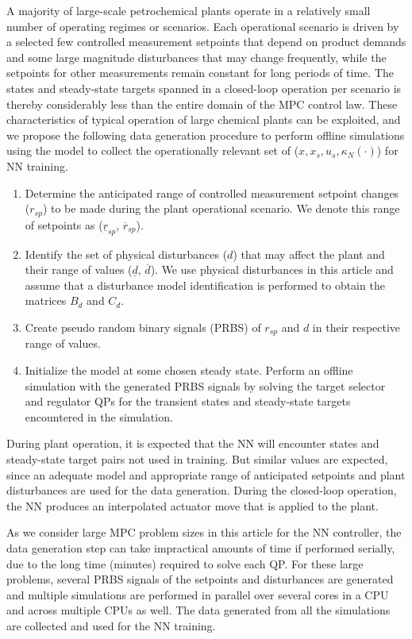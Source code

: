 \documentclass[preprint,5p, twocolumn, authoryear]{elsarticle}
\begin{document}
A majority of large-scale petrochemical plants operate in a relatively small
number of operating regimes or scenarios. Each operational scenario is driven by
a selected few controlled measurement setpoints that depend on product demands
and some large magnitude disturbances that may change frequently, while the
setpoints for other measurements remain constant for long periods of time. The
states and steady-state targets spanned in a closed-loop operation per scenario
is thereby considerably less than the entire domain of the MPC control law.
These characteristics of typical operation of large chemical plants can be
exploited, and we propose the following data generation procedure to perform
offline simulations using the model to collect the operationally relevant set of
($x, x_s, u_s, \kappa_N(\cdot)$) for NN training.

\begin{enumerate}
    \item Determine the anticipated range of controlled measurement setpoint
    changes ($r_{sp}$) to be made during the plant operational scenario. We
    denote this range of setpoints as ($\underline{r}_{sp}$,
    $\overline{r}_{sp}$).
    \item Identify the set of physical disturbances ($d$) that may affect the
    plant and their range of values ($\underline{d}$, $\overline{d}$). We use
    physical disturbances in this article and assume that a disturbance model
    identification is performed to obtain the matrices $B_d$ and $C_d$.
    \item Create pseudo random binary signals (PRBS) of $r_{sp}$ and $d$ in
    their respective range of values.
    \item Initialize the model at some chosen steady state. Perform an offline
    simulation with the generated PRBS signals by solving the target selector
    and regulator QPs for the transient states and steady-state targets
    encountered in the simulation. 
\end{enumerate}

During plant operation, it is expected that the NN will encounter states and
steady-state target pairs not used in training. But similar values are expected,
since an adequate model and appropriate range of anticipated setpoints and plant
disturbances are used for the data generation. During the closed-loop operation,
the NN produces an interpolated actuator move that is applied to the plant. 

As we consider large MPC problem sizes in this article for the NN controller,
the data generation step can take impractical amounts of time if performed
serially, due to the long time (minutes) required to solve each QP. For these
large problems, several PRBS signals of the setpoints and disturbances are
generated and multiple simulations are performed in parallel over several cores
in a CPU and across multiple CPUs as well. The data generated from all the
simulations are collected and used for the NN training.
\end{document}
